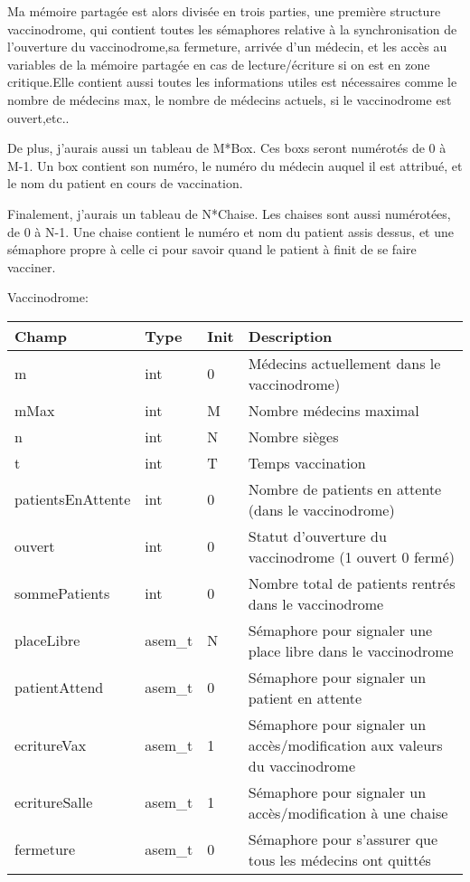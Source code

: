 \documentclass[a4paper]{article}
\makeatletter
\newenvironment{expl}{%
  \begin{list}{}{%
      \small\itshape%
      \topsep\z@%
      \listparindent0pt%
      \parsep0.75\baselineskip%
      \setlength{\leftmargin}{20mm}%
      \setlength{\rightmargin}{20mm}%
    }
  \item[]}%
  {\end{list}}
\makeatother
\begin{document}
\begin{expl}
  Ma mémoire partagée est alors divisée en trois parties, une première structure vaccinodrome, qui contient toutes les sémaphores relative à la synchronisation de l'ouverture du vaccinodrome,sa fermeture, arrivée d'un médecin, et les accès au variables de la mémoire partagée en cas de lecture/écriture si on est en zone critique.Elle contient aussi toutes les informations utiles est nécessaires comme le nombre de médecins max, le nombre de médecins actuels, si le vaccinodrome est ouvert,etc..
  
  De plus, j'aurais aussi un tableau de M*Box.
  Ces boxs seront numérotés de 0 à M-1. Un box contient son numéro, le numéro du médecin auquel il est attribué, et le nom du patient en cours de vaccination.
  
  Finalement, j'aurais un tableau de N*Chaise.
  Les chaises sont aussi numérotées, de 0 à N-1. Une chaise contient le numéro et nom du patient assis dessus, et une sémaphore propre à celle ci pour savoir quand le patient à finit de se faire vacciner.

  
   
    \pagebreak
     Vaccinodrome:
     
  \begin{tabularx}{\linewidth}{|l|l|l|X|}
    \hline
    Champ & Type & Init & Description \\ \hline%
    m & int & 0 & Médecins actuellement dans le vaccinodrome) \\ \hline%
    mMax & int & M & Nombre médecins maximal \\ \hline%
    n & int & N & Nombre sièges \\ \hline%
    t & int & T & Temps vaccination \\ \hline%
    patientsEnAttente & int & 0 & Nombre de patients en attente (dans le vaccinodrome) \\ \hline%
    ouvert & int & 0 & Statut d'ouverture du vaccinodrome (1 ouvert 0 fermé)\\ \hline%
    sommePatients & int & 0 & Nombre total de patients rentrés dans le vaccinodrome \\ \hline%
    placeLibre & asem\_t & N & Sémaphore pour signaler une place libre dans le vaccinodrome \\ \hline%
    patientAttend & asem\_t & 0 & Sémaphore pour signaler un patient en attente \\ \hline%
    ecritureVax & asem\_t & 1 & Sémaphore pour signaler un accès/modification aux valeurs du vaccinodrome \\ \hline%
    ecritureSalle & asem\_t & 1 & Sémaphore pour signaler un accès/modification à une chaise \\ \hline%
    fermeture & asem\_t & 0 & Sémaphore pour s'assurer que tous les médecins ont quittés \\ \hline%
    

\end{tabularx}
\end{expl}
\end{document}
